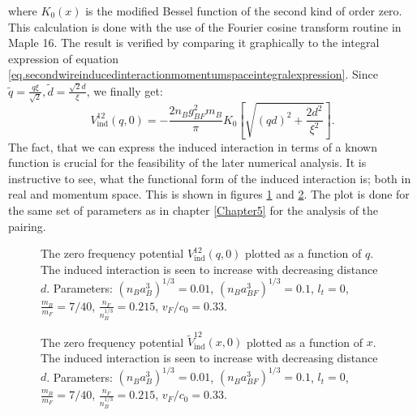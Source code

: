 where $K_0(x)$ is the modified Bessel function of the second kind of order zero. This calculation is done with the use of the Fourier cosine transform routine in Maple 16. The result is verified by comparing it graphically to the integral expression of equation \eqref{eq.secondwireinducedinteractionmomentumspaceintegralexpression}. Since $\tilde{q} = \frac{q\xi}{\sqrt{2}}, \tilde{d} = \frac{\sqrt{2}d}{\xi}$, we finally get:
 \begin{equation}
V_{\text{ind}}^{12}(q,0) = -\frac{2n_Bg^2_{BF}m_B}{\pi}K_0\left[\sqrt{(qd)^2+\frac{2d^2}{\xi^2}}\right]. 
\label{eq.VFF12indq}
\end{equation}
The fact, that we can express the induced interaction in terms of a known function is crucial for the feasibility of the later numerical analysis. It is instructive to see, what the functional form of the induced interaction is; both in real and momentum space.  This is shown in figures \ref{fig.VFF12indq} and \ref{fig.VFF12indx}. The plot is done for the same set of parameters as in chapter \ref{Chapter5} for the analysis of the pairing. 

\begin{figure} 
\begin{center}  
  
\caption{The zero frequency potential $V_{\text{ind}}^{12}(q,0)$ plotted as a function of $q$. The induced interaction is seen to increase with decreasing distance $d$. Parameters: $(n_Ba_B^3)^{1/3} = 0.01$, $(n_Ba_{BF}^3)^{1/3} = 0.1$, $l_t = 0$, $\frac{m_B}{m_F} = 7/40$, $\frac{n_F}{n_B^{1/3}} = 0.215$, $v_F/c_0 = 0.33$.}  
\label{fig.VFF12indq}  
\end{center}    
\end{figure}

\begin{figure} 
\begin{center}  
  
\caption{The zero frequency potential $\tilde{V}_{\text{ind}}^{12}(x,0)$ plotted as a function of $x$. The induced interaction is seen to increase with decreasing distance $d$. Parameters: $(n_Ba_B^3)^{1/3} = 0.01$, $(n_Ba_{BF}^3)^{1/3} = 0.1$, $l_t = 0$, $\frac{m_B}{m_F} = 7/40$, $\frac{n_F}{n_B^{1/3}} = 0.215$, $v_F/c_0 = 0.33$.}  
\label{fig.VFF12indx}  
\end{center}    
\end{figure}

